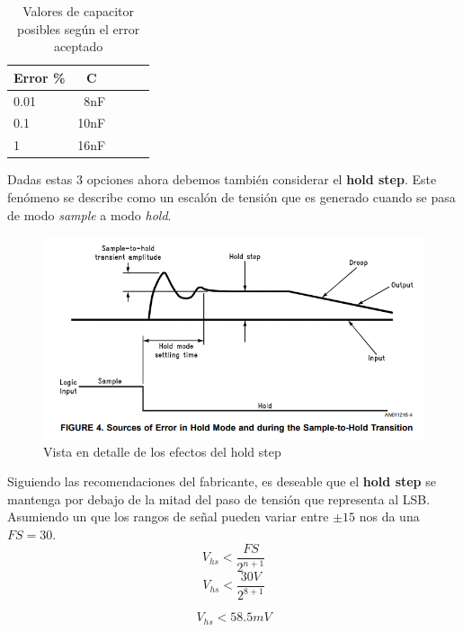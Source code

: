 \begin{table}[H]
	\centering
	\begin{tabular}{@{}lrlll@{}}
		\toprule
		\multicolumn{1}{c}{\textbf{Error \%}} & \multicolumn{1}{c}{\textbf{C}} &  &  &  \\ \midrule
		0.01                                  & 8nF                            &  &  &  \\
		0.1                                   & 10nF                           &  &  &  \\
		1                                     & 16nF                           &  &  &  \\ \bottomrule
	\end{tabular}
	\caption{Valores de capacitor posibles según el error aceptado}
	\label{tab:acqCap}
\end{table}
	
Dadas estas 3 opciones ahora debemos también considerar el \textbf{hold step}. Este fenómeno se describe como un escalón de tensión que es generado cuando se pasa de modo \textit{sample} a modo \textit{hold}.
\begin{figure}[H]
	\centering
	\includegraphics[scale=0.6]{ImagenesEjercicio4/HoldStepError}
	\caption{Vista en detalle de los efectos del hold step}
	\label{fig:holdsteperror}
\end{figure}

Siguiendo las recomendaciones del fabricante, es deseable que el \textbf{hold step} se mantenga por debajo de la mitad del paso de tensión que representa al LSB. Asumiendo un que los rangos de señal pueden variar entre $\pm15$ nos da una $FS=30$.
$$V_{hs}<\frac{FS}{2^{n+1}}$$
$$V_{hs}<\frac{30V}{2^{8+1}}$$

$$V_{hs}< 58.5mV$$

